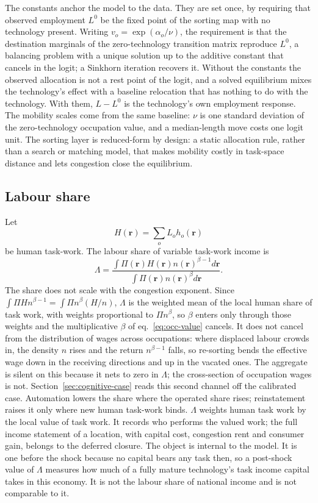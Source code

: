 \documentclass[12pt, a4paper]{article}
\begin{document}
The constants anchor the model to the data. They are set once, by
requiring that observed employment $L^0$ be the fixed point of the
sorting map with no technology present. Writing
$v_o=\exp(\alpha_o/\nu)$, the requirement is that the destination
marginals of the zero-technology transition matrix reproduce $L^0$, a
balancing problem with a unique solution up to the additive constant
that cancels in the logit; a Sinkhorn iteration recovers it. Without
the constants the observed allocation is not a rest point of the
logit, and a solved equilibrium mixes the technology's effect with a
baseline relocation that has nothing to do with the technology. With
them, $L-L^0$ is the technology's own employment response. The
mobility scales come from the same baseline: $\nu$ is one standard
deviation of the zero-technology occupation value, and a median-length
move costs one logit unit.
The sorting layer is reduced-form by design: a static allocation rule,
rather than a search or matching model, that makes mobility costly in
task-space distance and lets congestion close the equilibrium.

\subsection{Labour share}
\label{sec:labour-share}

Let
\[
  H(\mathbf{r})
  =
  \sum_o L_o h_o(\mathbf{r})
\]
be human task-work. The labour share of variable task-work income is
\begin{equation}
  \Lambda
  =
  \frac{
    \int
    \Pi(\mathbf{r})
    H(\mathbf{r})
    n(\mathbf{r})^{\beta-1}
    d\mathbf{r}
  }{
    \int
    \Pi(\mathbf{r})
    n(\mathbf{r})^\beta
    d\mathbf{r}
  }.
  \label{eq:labour-share}
\end{equation}
The share does not scale with the congestion exponent. Since
$\int\Pi H n^{\beta-1} = \int \Pi n^{\beta}(H/n)$, $\Lambda$ is the
weighted mean of the local human share of task work, with weights
proportional to $\Pi n^{\beta}$, so $\beta$ enters only through those
weights and the multiplicative $\beta$ of eq.~\eqref{eq:occ-value}
cancels. It does not cancel from the distribution of wages across
occupations: where displaced labour crowds in, the density $n$ rises
and the return $n^{\beta-1}$ falls, so re-sorting bends the effective
wage down in the receiving directions and up in the vacated ones. The
aggregate is silent on this because it nets to zero in $\Lambda$; the
cross-section of occupation wages is not. Section~\ref{sec:cognitive-case}
reads this second channel off the calibrated case.
Automation lowers the
share where the operated share rises; reinstatement raises it only where
new human task-work binds. $\Lambda$ weights human task work by the
local value of task work. It records who performs the valued work; the
full income statement of a location, with capital cost, congestion rent
and consumer gain, belongs to the deferred closure. The object is
internal to the model. It is one before the shock because no capital
bears any task then, so a post-shock value of $\Lambda$ measures how
much of a fully mature technology's task income capital takes in this
economy. It is not the labour share of national income and is not
comparable to it.
\end{document}
